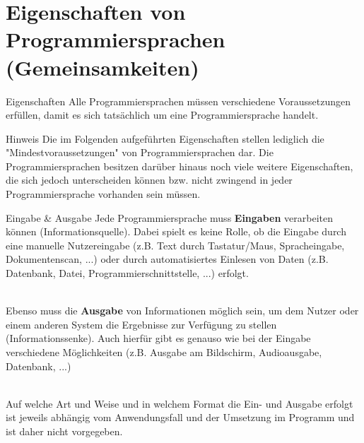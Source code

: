     
\section{Eigenschaften von Programmiersprachen (Gemeinsamkeiten)}
    \label{sec:properties}
    
    \begin{frame}{Eigenschaften}
        Alle Programmiersprachen müssen verschiedene Voraussetzungen erfüllen, damit es sich tatsächlich um eine Programmiersprache handelt. 
        
        \begin{alertblock}{Hinweis}
            Die im Folgenden aufgeführten Eigenschaften stellen lediglich die "Mindestvoraussetzungen" von Programmiersprachen dar. Die Programmiersprachen besitzen darüber hinaus noch viele weitere Eigenschaften, die sich jedoch unterscheiden können bzw. nicht zwingend in jeder Programmiersprache vorhanden sein müssen.
        \end{alertblock}
    \end{frame}
     
    \begin{frame}{Eingabe \& Ausgabe}
        Jede Programmiersprache muss \textbf{Eingaben} verarbeiten können (Informationsquelle). Dabei spielt es keine Rolle, ob die Eingabe durch eine manuelle Nutzereingabe (z.B. Text durch Tastatur/Maus, Spracheingabe, Dokumentenscan, ...) oder durch automatisiertes Einlesen von Daten (z.B. Datenbank, Datei, Programmierschnittstelle, ...)  erfolgt. \\~\
        
        Ebenso muss die \textbf{Ausgabe} von Informationen möglich sein, um dem Nutzer oder einem anderen System die Ergebnisse zur Verfügung zu stellen (Informationssenke). Auch hierfür gibt es genauso wie bei der Eingabe verschiedene Möglichkeiten (z.B. Ausgabe am Bildschirm, Audioausgabe, Datenbank, ...)  \\~\
        
        Auf welche Art und Weise und in welchem Format die Ein- und Ausgabe erfolgt ist jeweils abhängig vom Anwendungsfall und der Umsetzung im Programm und ist daher nicht vorgegeben.
        
    \end{frame}
    
